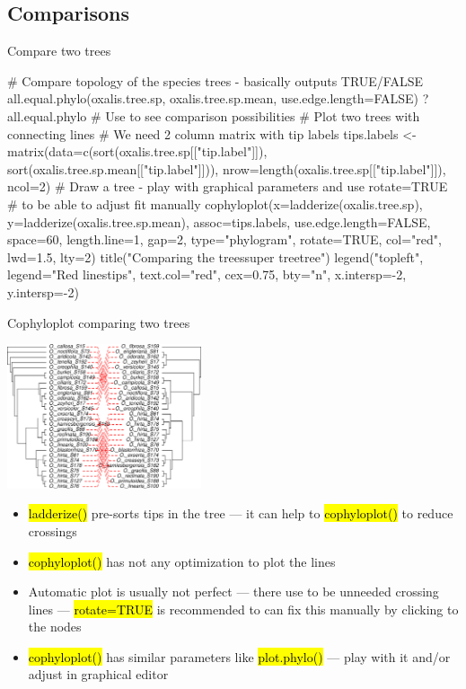 \documentclass[compress, ucs, xelatex, 11pt, xcolor=svgnames,
	hyperref={
		bookmarks=true,
		unicode=true,
		colorlinks=true,
		pdftitle={Molecular data in R},
		plainpages=false,
		pdfauthor={Vojtech Zeisek},
		pdfsubject={Course about phylogeny and evolution in R},
		pdfcreator={XeLaTeX},
		pdfkeywords={R, evolution, phylogeny, molecular data},
		linkcolor=Tomato,
		anchorcolor=SaddleBrown,
		citecolor=Goldenrod,
		filecolor=DarkMagenta,
		menucolor=Sienna,
		urlcolor=DarkTurquoise,
		pdftex},
	url={hyphens, lowtilde} %
	]{beamer}
\renewcommand{\texttt}[1]{\hl{\ttfamily #1}}
\begin{document}
\subsection{Comparisons}

\begin{frame}[fragile]{Compare two trees}
	\begin{spluscode}
    # Compare topology of the species trees - basically outputs TRUE/FALSE
    all.equal.phylo(oxalis.tree.sp, oxalis.tree.sp.mean,
      use.edge.length=FALSE)
    ?all.equal.phylo # Use to see comparison possibilities
    # Plot two trees with connecting lines
    # We need 2 column matrix with tip labels
    tips.labels <- matrix(data=c(sort(oxalis.tree.sp[["tip.label"]]),
      sort(oxalis.tree.sp.mean[["tip.label"]])),
      nrow=length(oxalis.tree.sp[["tip.label"]]), ncol=2)
    # Draw a tree - play with graphical parameters and use rotate=TRUE
    # to be able to adjust fit manually
    cophyloplot(x=ladderize(oxalis.tree.sp),
      y=ladderize(oxalis.tree.sp.mean), assoc=tips.labels,
      use.edge.length=FALSE, space=60, length.line=1, gap=2,
      type="phylogram", rotate=TRUE, col="red", lwd=1.5, lty=2)
    title("Comparing the trees\nParsimony super tree\tSpecies tree")
    legend("topleft", legend="Red lines\nconnect tips", text.col="red",
      cex=0.75, bty="n", x.intersp=-2, y.intersp=-2)
	\end{spluscode}
\end{frame}

\begin{frame}{Cophyloplot comparing two trees}
	\begin{multicols}{2}
		\begin{center}
			\includegraphics[height=4.25cm]{cophyloplot.png}
		\end{center}
		\begin{itemize}
			\item \texttt{ladderize()} pre-sorts tips in the tree --- it can help to \texttt{cophyloplot()} to reduce crossings
			\item \texttt{cophyloplot()} has not any optimization to plot the lines
			\item Automatic plot is usually not perfect --- there use to be unneeded crossing lines --- \texttt{rotate=TRUE} is recommended to can fix this manually by clicking to the nodes
			\item \texttt{cophyloplot()} has similar parameters like \texttt{plot.phylo()} --- play with it and/or adjust in graphical editor
		\end{itemize}
	\end{multicols}
\end{frame}
\end{document}
